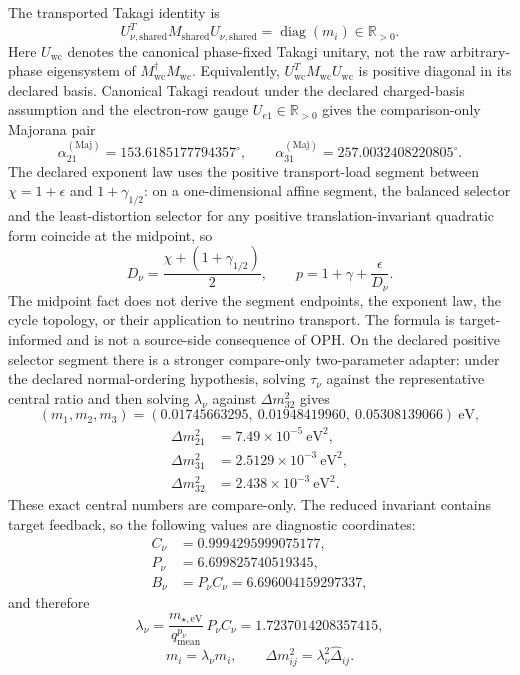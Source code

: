 \documentclass[11pt]{article}
\begin{document}
The transported Takagi identity is
\[
U_{\nu,\mathrm{shared}}^T M_{\mathrm{shared}} U_{\nu,\mathrm{shared}}
=\operatorname{diag}(m_i)\in\mathbb R_{>0}.
\]
Here \(U_{\mathrm{wc}}\) denotes the canonical phase-fixed Takagi unitary, not the raw
arbitrary-phase eigensystem of \(M_{\mathrm{wc}}^\dagger M_{\mathrm{wc}}\).
Equivalently, \(U_{\mathrm{wc}}^T M_{\mathrm{wc}}U_{\mathrm{wc}}\) is positive diagonal in its
declared basis. Canonical Takagi readout under the
declared charged-basis assumption and the electron-row gauge \(U_{e1}\in\mathbb R_{>0}\) gives the
comparison-only Majorana pair
\[
\alpha_{21}^{(\mathrm{Maj})}=153.6185177794357^\circ,
\qquad
\alpha_{31}^{(\mathrm{Maj})}=257.0032408220805^\circ.
\]
The declared exponent law uses the positive transport-load segment between
\(\chi=1+\epsilon\) and \(1+\gamma_{1/2}\): on a one-dimensional affine segment,
the balanced selector and the least-distortion selector for any positive
translation-invariant quadratic form coincide at the midpoint, so
\[
D_\nu=\frac{\chi+(1+\gamma_{1/2})}{2},
\qquad
p=1+\gamma+\frac{\epsilon}{D_\nu}.
\]
The midpoint fact does not derive the segment endpoints, the exponent law, the cycle topology, or
their application to neutrino transport. The formula is target-informed and is not a source-side
consequence of OPH.
On the declared positive selector segment there is a stronger compare-only two-parameter adapter:
under the declared normal-ordering hypothesis, solving \(\tau_\nu\) against the representative
central ratio and then solving \(\lambda_\nu\) against \(\Delta m_{32}^2\) gives
\[
(m_1,m_2,m_3)=(0.01745663295,\ 0.01948419960,\ 0.05308139066)\ \mathrm{eV},
\]
\[
\begin{aligned}
\Delta m_{21}^2&=7.49\times10^{-5}\ \mathrm{eV}^2,\\
\Delta m_{31}^2&=2.5129\times10^{-3}\ \mathrm{eV}^2,\\
\Delta m_{32}^2&=2.438\times10^{-3}\ \mathrm{eV}^2.
\end{aligned}
\]
These exact central numbers are compare-only. The reduced invariant contains target feedback, so
the following values are diagnostic coordinates:
\[
\begin{aligned}
C_\nu&=0.9994295999075177,\\
P_\nu&=6.699825740519345,\\
B_\nu&=P_\nu C_\nu=6.696004159297337,
\end{aligned}
\]
and therefore
\[
\lambda_\nu=\frac{m_{\star,\mathrm{eV}}}{q_{\mathrm{mean}}^{p_\nu}}\,P_\nu C_\nu=1.7237014208357415,
\]
\[
m_i=\lambda_\nu \widehat m_i,
\qquad
\Delta m_{ij}^2=\lambda_\nu^2 \widehat{\Delta}_{ij}.
\]
\end{document}
